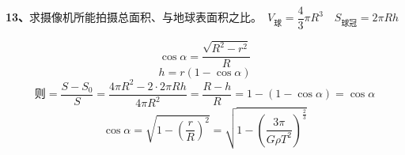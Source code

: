 \begin{problem}[13]
\textbf{13、}求摄像机所能拍摄总面积、与地球表面积之比。　$V_{\text{球}}=\dfrac{4}{3}\pi R^3$　$S_{\text{球冠}}=2\pi Rh$
\begin{solution}
\[ \cos\alpha=\dfrac{\sqrt{R^2-r^2}}{R} \]
\[ h=r(1-\cos\alpha) \]
\[ \text{则}=\dfrac{S-S_0}{S}=\dfrac{4\pi R^2-2\cdot2\pi Rh}{4\pi R^2}=\dfrac{R-h}{R}=1-(1-\cos\alpha)=\cos\alpha \]
\[ \cos\alpha=\sqrt{1-\left(\dfrac{r}{R}\right)^2}=\sqrt{1-\left(\dfrac{3\pi}{G\rho T^2}\right)^{\frac{2}{3}}} \]
\end{solution}
\end{problem}
